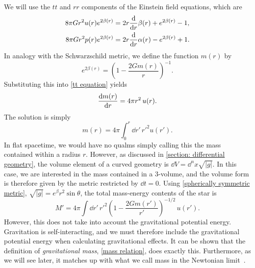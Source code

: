 %
We will use the $tt$ and $rr$ components of the Einstein field equations, which are
%
\begin{align}
    \label{tt equation}
    8 \pi G r^{2} u{\left(r \right)} e^{2 \beta{\left(r \right)}} 
    & =   2 r \odv{}{r} \beta{\left(r \right)} + e^{2 \beta{\left(r \right)}} - 1, \\
    \label{rr equation}
    8 \pi G r^{2} p{\left(r \right)} e^{2 \beta{\left(r \right)}} 
    & = 2 r \odv{}{r}\alpha{\left(r \right)} - e^{2 \beta{\left(r \right)}} + 1.
\end{align}
%
In analogy with the Schwarzschild metric, we define the function $m(r)$ by
%
\begin{equation}
    \label{definition of m(r)}
    e^{2 \beta(r)} = \left(1 - \frac{2 G m(r)}{r} \right)^{-1}. 
\end{equation}
%
Substituting this into \autoref{tt equation} yields 
%
\begin{equation}
    \label{diff eq mass}
    \odv{m(r)}{r} = 4 \pi r^2 \, u(r).
\end{equation}
%
The solution is simply
%
\begin{equation}
    \label{mass relation}
    m(r) = 4 \pi \int_0^r \dd r' \, {r'}^2 u(r').
\end{equation}
%
In flat spacetime, we would have no qualms simply calling this the mass contained within a radius $r$.
However, as discussed in \autoref{section: differential geometry}, the volume element of a curved geometry is $\dd V = \dd^n x \sqrt{|g|}$.
In this case, we are interested in the mass contained in a 3-volume, and the volume form is therefore given by the metric restricted by $\dd t = 0$.
Using \autoref{spherically symmetric metric}, $\sqrt{|g|} = e^{\beta} r^2 \sin \theta$, the total mass-energy contents of the star is 
%
\begin{equation}
    M' = 4 \pi \int \dd r' \, {r'}^2 \left(1 - \frac{2 G m(r')}{r'}\right)^{-1/2}\, u(r').
\end{equation}
%
However, this does not take into account the gravitational potential energy.
Gravitation is self-interacting, and we must therefore include the gravitational potential energy when calculating gravitational effects.
It can be shown that the definition of \emph{gravitational mass}, \autoref{mass relation}, does exactly this.
Furthermore, as we will see later, it matches up with what we call mass in the Newtonian limit~\autocite{misnerGravitation2009}.



